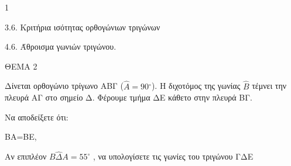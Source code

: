 \begin{ylh}{1}
    \item 3.6. Κριτήρια ισότητας ορθογώνιων τριγώνων
    \item 4.6. Άθροισμα γωνιών τριγώνου.
\end{ylh}

ΘΕΜΑ 2

Δίνεται ορθογώνιο τρίγωνο ΑΒΓ ($\widehat{A} = 90{^\circ}$). Η διχοτόμος της γωνίας $\widehat{B}$ τέμνει την πλευρά ΑΓ στο σημείο Δ. Φέρουμε τμήμα ΔΕ κάθετο στην πλευρά ΒΓ.

\begin{center}
\end{center}

Να αποδείξετε ότι:

\begin{alist}
\item ΒΑ=ΒΕ, 

\item Αν επιπλέον $B\widehat{\Delta}A = 55^\circ$
, να υπολογίσετε τις γωνίες του τριγώνου ΓΔΕ 
\end{alist}
